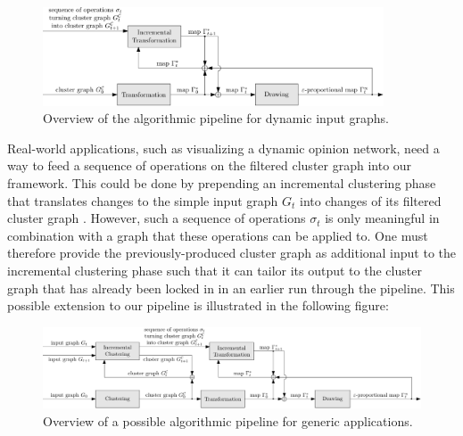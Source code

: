 \begin{figure}[H]
	\centering\includegraphics[width=0.9\textwidth]{Resources/Framework-3.pdf}
	\caption{Overview of the algorithmic pipeline for dynamic input graphs.}
	\label{fig:dynamic-pipeline-thesis}
\end{figure}

Real-world applications, such as visualizing a dynamic opinion network, need a way to feed a sequence of operations on the filtered cluster graph into our framework.
This could be done by prepending an incremental clustering phase that translates changes to the simple input graph $G_t$ into changes of its filtered cluster graph .
However, such a sequence of operations $\sigma_t$ is only meaningful in combination with a graph that these operations can be applied to.
One must therefore provide the previously-produced cluster graph  as additional input to the incremental clustering phase such that it can tailor its output to the cluster graph that has already been locked in in an earlier run through the pipeline.
This possible extension to our pipeline is illustrated in the following figure:
%
\begin{figure}[H]
	\centering\includegraphics[width=\textwidth]{Resources/Framework-4.pdf}
	\caption{Overview of a possible algorithmic pipeline for generic applications.}
	\label{fig:dynamic-pipeline-application}
\end{figure}

